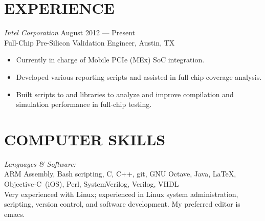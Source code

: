 \documentclass[margin]{res}
\begin{document}
\begin{resume}
  \section{EXPERIENCE} {\sl Intel Corporation} 
  \hfill August 2012 --- Present \\
  Full-Chip Pre-Silicon Validation Engineer, Austin, TX
  \vspace{0.25em}
  \begin{itemize}
  \item Currently in charge of Mobile PCIe (MEx) SoC integration.
  \item Developed various reporting scripts and assisted in full-chip
    coverage analysis.
  \item Built scripts to and libraries to analyze and improve
    compilation and simulation performance in full-chip testing.
  \end{itemize}

  \section{COMPUTER SKILLS} 
  {\sl Languages \& Software:} \\
  ARM Assembly, Bash scripting, C, C++, git, GNU Octave, Java, \LaTeX, \\
  \mbox{Objective-C (iOS)}, Perl, SystemVerilog, Verilog, VHDL
  \vspace{0.5em}\\
  Very experienced with Linux; experienced in Linux system
  administration, scripting, version control, and software
  development. My preferred editor is emacs.


\end{resume}
\end{document}
